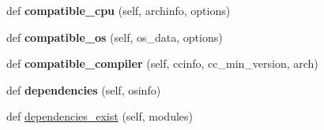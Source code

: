 \begin{DoxyCompactItemize}
\item 
\mbox{\label{classconfigure_1_1_module_info_aecd040d71026b1f14c131b96cc792e3b}} 
def {\bfseries compatible\+\_\+cpu} (self, archinfo, options)
\item 
\mbox{\label{classconfigure_1_1_module_info_ab6081fc99b1b5f891b6d88fc0cf8d297}} 
def {\bfseries compatible\+\_\+os} (self, os\+\_\+data, options)
\item 
\mbox{\label{classconfigure_1_1_module_info_a99fa28900d881672cb10b16edbff2175}} 
def {\bfseries compatible\+\_\+compiler} (self, ccinfo, cc\+\_\+min\+\_\+version, arch)
\item 
\mbox{\label{classconfigure_1_1_module_info_a440add5c89763e2aa5e0a8b1ce1870c4}} 
def {\bfseries dependencies} (self, osinfo)
\item 
def \mbox{\hyperlink{classconfigure_1_1_module_info_a256a954aacfc4cf41ffce0797192819d}{dependencies\+\_\+exist}} (self, modules)
\end{DoxyCompactItemize}
